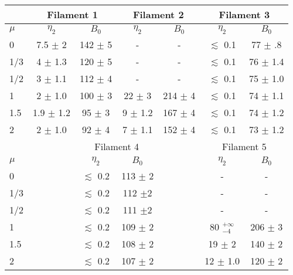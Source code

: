 \begin{tabular}{@{} l c c c c c c @{}}
\toprule
{}&\multicolumn{2}{c}{Filament 1} & \multicolumn{2}{c}{Filament 2} & \multicolumn{2}{c}{Filament 3} \\
\midrule
$\mu$ &$\eta_{2}$ & $B_{0}$ &$\eta_{2}$ & $B_{0}$ & $\eta_{2}$ & $B_{0}$ \\
0 & 7.5 $\pm$ 2 & 142 $\pm$ 5 & - & - & $\lesssim$ 0.1& 77 $\pm$ .8\\
1/3 & 4 $\pm$ 1.3 & 120 $\pm$ 5 & - & - & $\lesssim$ 0.1 & 76 $\pm$ 1.4 \\
1/2 & 3 $\pm$ 1.1 & 112 $\pm$ 4 & - & - & $\lesssim$ 0.1 & 75 $\pm$ 1.0 \\
1 & 2 $\pm$ 1.0 & 100 $\pm$ 3 & 22 $\pm$ 3 & 214 $\pm$ 4 & $\lesssim$ 0.1 & 74 $\pm$ 1.1 \\
1.5 & 1.9 $\pm$ 1.2 & 95 $\pm$ 3 & 9 $\pm$ 1.2 & 167 $\pm$ 4 & $\lesssim$ 0.1 & 74 $\pm$ 1.2   \\
2 & 2 $\pm$ 1.0 & 92 $\pm$ 4  & 7 $\pm$ 1.1 & 152 $\pm$ 4 & $\lesssim$ 0.1 & 73 $\pm$ 1.2 \\
\midrule
& &\multicolumn{2}{c}{Filament 4} && \multicolumn{2}{c}{Filament 5} \\
\midrule
$\mu$ &&$\eta_{2}$ & $B_{0}$ &&$\eta_{2}$ & $B_{0}$\\
0 &&  $\lesssim$ 0.2 & 113 $\pm$ 2 && -& -\\
1/3 &&  $\lesssim$ 0.2 & 112 $\pm$2 && -& -\\
1/2 && $\lesssim$ 0.2  & 111 $\pm$2 && - & -\\
1 &&  $\lesssim$ 0.2 & 109 $\pm$ 2 && 80 $^{+\infty}_{-4}$   & 206 $\pm$ 3\\
1.5 && $\lesssim$ 0.2 & 108 $\pm$ 2 && 19 $\pm$ 2  & 140 $\pm$ 2\\
2 && $\lesssim$ 0.2 & 107 $\pm$ 2 && 12 $\pm$ 1.0  & 120 $\pm$ 2\\
\bottomrule
\end{tabular}
